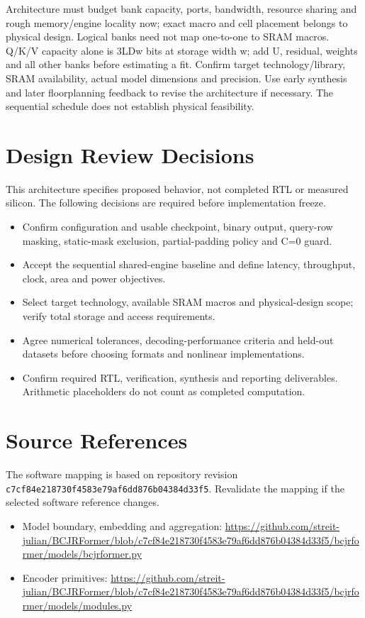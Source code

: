 \documentclass[11pt,a4paper]{article}
\begin{document}
Architecture must budget bank capacity, ports, bandwidth, resource sharing and rough memory/engine locality now; exact macro and cell placement belongs to physical design. Logical banks need not map one-to-one to SRAM macros. Q/K/V capacity alone is 3LDw bits at storage width w; add U, residual, weights and all other banks before estimating a fit. Confirm target technology/library, SRAM availability, actual model dimensions and precision. Use early synthesis and later floorplanning feedback to revise the architecture if necessary. The sequential schedule does not establish physical feasibility.

\section{Design Review Decisions}
This architecture specifies proposed behavior, not completed RTL or measured silicon. The following decisions are required before implementation freeze.
\begin{itemize}
\item Confirm configuration and usable checkpoint, binary output, query-row masking, static-mask exclusion, partial-padding policy and C=0 guard.
\item Accept the sequential shared-engine baseline and define latency, throughput, clock, area and power objectives.
\item Select target technology, available SRAM macros and physical-design scope; verify total storage and access requirements.
\item Agree numerical tolerances, decoding-performance criteria and held-out datasets before choosing formats and nonlinear implementations.
\item Confirm required RTL, verification, synthesis and reporting deliverables. Arithmetic placeholders do not count as completed computation.
\end{itemize}
\section{Source References}
The software mapping is based on repository revision \texttt{c7cf84e218730f4583e79af6dd876b04384d33f5}. Revalidate the mapping if the selected software reference changes.
\begin{itemize}
\item Model boundary, embedding and aggregation: \url{https://github.com/streit-julian/BCJRFormer/blob/c7cf84e218730f4583e79af6dd876b04384d33f5/bcjrformer/models/bcjrformer.py}
\item Encoder primitives: \url{https://github.com/streit-julian/BCJRFormer/blob/c7cf84e218730f4583e79af6dd876b04384d33f5/bcjrformer/models/modules.py}
\end{itemize}
\end{document}

